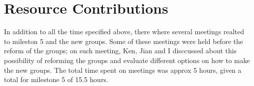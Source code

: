 \documentclass{article}
\begin{document}
\section*{Resource Contributions}

In addition to all the time specified above, there where several meetings realted to mileston 5 and the new groups.  Some of these meetings were held before the reform of the groups; on such meeting,  Ken, Jian and I disccussed about this possibility of reforming the groups and evaluate different options on how to make the new groups.  The total time spent on meetings was approx 5 hours, given a total for milestone 5 of 15.5 hours.
\end{document}
